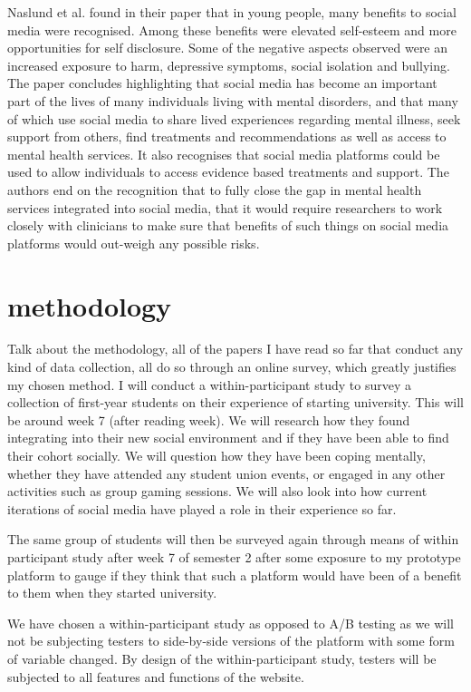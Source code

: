 \documentclass[lettersize,journal]{IEEEtran}
\begin{document}
    Naslund et al. \cite{Naslund et al 2020} found in their paper that in young people, many benefits to social media were recognised.
    Among these benefits were elevated self-esteem and more opportunities for self disclosure. Some of the negative aspects observed were an
    increased exposure to harm, depressive symptoms, social isolation and bullying.
    The paper concludes highlighting that social media has become an important part of the lives of many individuals living
    with mental disorders, and that many of which use social media to share lived experiences regarding mental illness,
    seek support from others, find treatments and recommendations as well as access to mental health services. It also
    recognises that social media platforms could be used to allow individuals to access evidence based treatments and support.
    The authors end on the recognition that to fully close the gap in mental health services integrated into social media, that
    it would require researchers to work closely with clinicians to make sure that benefits of such things on social media
    platforms would out-weigh any possible risks.

    \section{methodology}
    Talk about the methodology, all of the papers I have read so far that conduct
    any kind of data collection, all do so through an online survey, which greatly
    justifies my chosen method. I will conduct a within-participant study to survey
    a collection of first-year students on their experience of starting university.
    This will be around week 7 (after reading week). We will research how they
    found integrating into their new social environment and if they have been able to
    find their cohort socially. We will question how they have been coping mentally,
    whether they have attended any student union events, or engaged in any other
    activities such as group gaming sessions. We will also look into how current
    iterations of social media have played a role in their experience so far.

    The same group of students will then be surveyed again through means of within
    participant study after week 7 of semester 2 after some exposure to my prototype
    platform to gauge if they think that such a platform would have been of a benefit
    to them when they started university.

    We have chosen a within-participant study as opposed to A/B
    testing as we will not be subjecting testers to side-by-side
    versions of the platform with some form of variable
    changed. By design of the within-participant study,
    testers will be subjected to all features and functions of the
    website.
\end{document}
